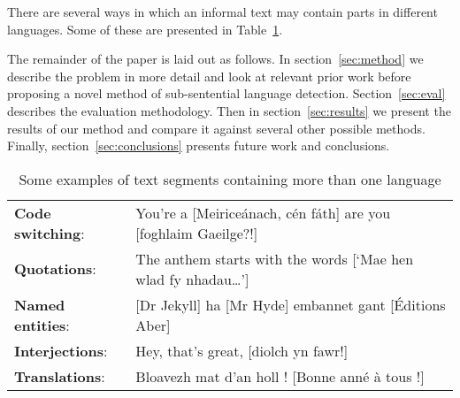 \documentclass[11pt]{article}
\begin{document}
There are several ways in which an informal text may contain parts in different languages.
Some of these are presented in Table~\ref{table:examples}.

The remainder of the paper is laid out as follows. In section~\ref{sec:method} we describe the problem
in more detail and look at relevant prior work before proposing a novel method of sub-sentential
language detection. Section~\ref{sec:eval} describes the evaluation methodology. Then in section~\ref{sec:results}
we present the results of our method and compare it against several other possible methods. Finally, section~\ref{sec:conclusions}
presents future work and conclusions.


\begin{table}[h]
\begin{center}
\vspace{-0.3cm}
\begin{tabular}{ll}
\textbf{Code switching}: & You're a [Meirice\'{a}nach, c\'{e}n f\'{a}th] are you [foghlaim Gaeilge?!] \\
\textbf{Quotations}: & The anthem starts with the words [`Mae hen wlad fy nhadau\ldots'] \\
\textbf{Named entities}: & [Dr Jekyll] ha [Mr Hyde] embannet gant [\'{E}ditions Aber] \\
\textbf{Interjections}: & Hey, that's great, [diolch yn fawr!] \\
\textbf{Translations}: & Bloavezh mat d'an holl ! [Bonne ann\'{e} \`{a} tous !] \\
\end{tabular}
\caption{Some examples of text segments containing more than one language}
\label{table:examples}
\end{center}
\end{table}
\vspace{-0.65cm}
\end{document}
